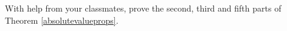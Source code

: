 {With help from your classmates, prove the second, third and fifth parts of Theorem \ref{absolutevalueprops}.}
{}